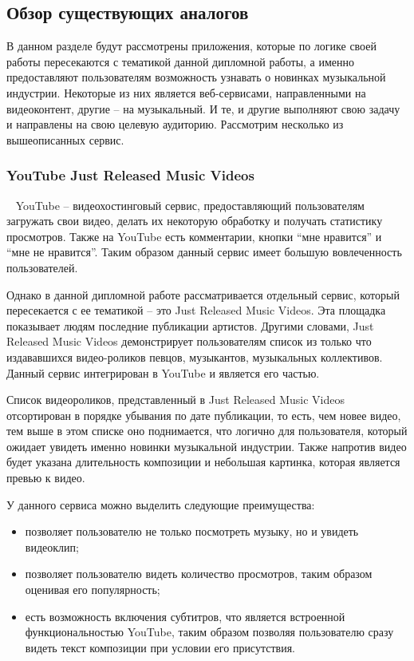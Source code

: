 \subsection{Обзор существующих аналогов}
\label{sub:domain:analogues_review}
В данном разделе будут рассмотрены приложения, которые по логике своей работы пересекаются с тематикой данной дипломной работы, а именно предоставляют пользователям возможность узнавать о новинках музыкальной индустрии. Некоторые из них является веб-сервисами, направленными на видеоконтент, другие -- на музыкальный. И те, и другие выполняют свою задачу и направлены на свою целевую аудиторию. Рассмотрим несколько из вышеописанных сервис.

\subsubsection{YouTube Just Released Music Videos}
\label{sub:domain:analogues_review:youtube}
~\newline
\indent YouTube -- видеохостинговый сервис, предоставляющий пользователям загружать свои видео, делать их некоторую обработку и получать статистику просмотров. Также на YouTube есть комментарии, кнопки “мне нравится” и “мне не нравится”. Таким образом данный сервис имеет большую вовлеченность пользователей.

Однако в данной дипломной работе рассматривается отдельный сервис, который пересекается с ее тематикой -- это Just Released Music Videos. Эта площадка показывает людям последние публикации артистов. Другими словами, Just Released Music Videos демонстрирует пользователям список из только что издававшихся видео-роликов певцов, музыкантов, музыкальных коллективов. Данный сервис интегрирован в YouTube и является его частью.

Список видеороликов, представленный в Just Released Music Videos отсортирован в порядке убывания по дате публикации, то есть, чем новее видео, тем выше в этом списке оно поднимается, что логично для пользователя, который ожидает увидеть именно новинки музыкальной индустрии. Также напротив видео будет указана длительность композиции и небольшая картинка, которая является превью к видео.

У данного сервиса можно выделить следующие преимущества:

\begin{itemize}
  \item позволяет пользователю не только посмотреть музыку, но и увидеть видеоклип;
  \item позволяет пользователю видеть количество просмотров, таким образом оценивая его популярность;
  \item есть возможность включения субтитров, что является встроенной функциональностью YouTube, таким образом позволяя пользователю сразу видеть текст композиции при условии его присутствия.
\end{itemize}

